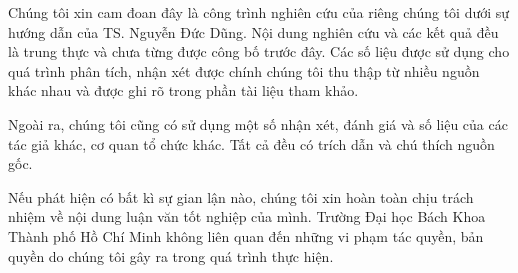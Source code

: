 \begin{declaration}
    Chúng tôi xin cam đoan đây là công trình nghiên cứu của riêng chúng tôi dưới sự hướng dẫn của TS. Nguyễn Đức Dũng. Nội dung nghiên cứu và các kết quả đều là trung thực và chưa từng được công bố trước đây. Các số liệu được sử dụng cho quá trình phân tích, nhận xét được chính chúng tôi thu thập từ nhiều nguồn khác nhau và được ghi rõ trong phần tài liệu tham khảo.

    Ngoài ra, chúng tôi cũng có sử dụng một số nhận xét, đánh giá và số liệu của các tác giả khác, cơ quan tổ chức khác. Tất cả đều có trích dẫn và chú thích nguồn gốc.

    Nếu phát hiện có bất kì sự gian lận nào, chúng tôi xin hoàn toàn chịu trách nhiệm về nội dung luận văn tốt nghiệp của mình. Trường Đại học Bách Khoa Thành phố Hồ Chí Minh không liên quan đến những vi phạm tác quyền, bản quyền do chúng tôi gây ra trong quá trình thực hiện.

\end{declaration}